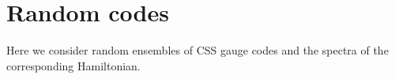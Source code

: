 \documentclass[12pt]{article}
\begin{document}
%
%
%

%
%

\section{Random codes}

Here we consider random ensembles of CSS gauge codes and
the spectra of the corresponding Hamiltonian.






{}


\end{document}

